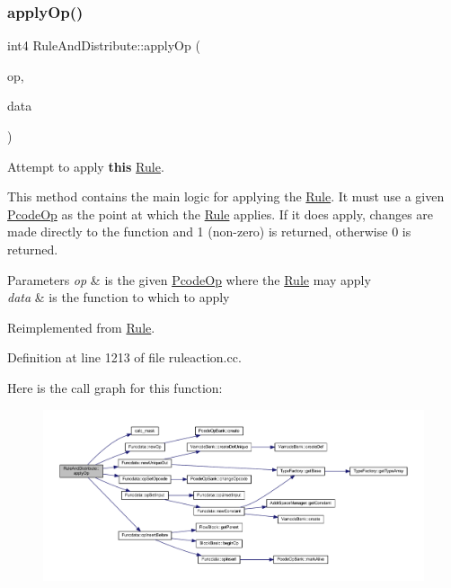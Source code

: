 \subsubsection{\texorpdfstring{applyOp()}{applyOp()}}
{\footnotesize\ttfamily int4 Rule\+And\+Distribute\+::apply\+Op (\begin{DoxyParamCaption}\item[{\mbox{\hyperlink{class_pcode_op}{Pcode\+Op}} $\ast$}]{op,  }\item[{\mbox{\hyperlink{class_funcdata}{Funcdata}} \&}]{data }\end{DoxyParamCaption})\hspace{0.3cm}{\ttfamily [virtual]}}



Attempt to apply {\bfseries{this}} \mbox{\hyperlink{class_rule}{Rule}}. 

This method contains the main logic for applying the \mbox{\hyperlink{class_rule}{Rule}}. It must use a given \mbox{\hyperlink{class_pcode_op}{Pcode\+Op}} as the point at which the \mbox{\hyperlink{class_rule}{Rule}} applies. If it does apply, changes are made directly to the function and 1 (non-\/zero) is returned, otherwise 0 is returned. 
\begin{DoxyParams}{Parameters}
{\em op} & is the given \mbox{\hyperlink{class_pcode_op}{Pcode\+Op}} where the \mbox{\hyperlink{class_rule}{Rule}} may apply \\
\hline
{\em data} & is the function to which to apply \\
\hline
\end{DoxyParams}


Reimplemented from \mbox{\hyperlink{class_rule_a4e3e61f066670175009f60fb9dc60848}{Rule}}.



Definition at line 1213 of file ruleaction.\+cc.

Here is the call graph for this function\+:
\nopagebreak
\begin{figure}[H]
\begin{center}
\leavevmode
\includegraphics[width=350pt]{class_rule_and_distribute_aa40f49c92c7f7088f01ffedff4b5700e_cgraph}
\end{center}
\end{figure}
\mbox{\label{class_rule_and_distribute_a7c22fc9d5e1f837afb8b13a9cc83ddff}} 
